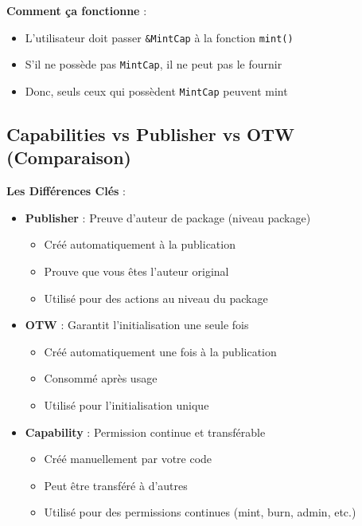 \documentclass[11pt]{article}
\begin{document}
\begin{noteBox}
\textbf{Comment ça fonctionne} :
\begin{itemize}
  \item L'utilisateur doit passer \texttt{\&MintCap} à la fonction \texttt{mint()}
  \item S'il ne possède pas \texttt{MintCap}, il ne peut pas le fournir
  \item Donc, seuls ceux qui possèdent \texttt{MintCap} peuvent mint
\end{itemize}
\end{noteBox}

\subsection{Capabilities vs Publisher vs OTW (Comparaison)}

\begin{explainBox}
\textbf{Les Différences Clés} :
\begin{itemize}
  \item \textbf{Publisher} : Preuve d'auteur de package (niveau package)
  \begin{itemize}
    \item Créé automatiquement à la publication
    \item Prouve que vous êtes l'auteur original
    \item Utilisé pour des actions au niveau du package
  \end{itemize}
  
  \item \textbf{OTW} : Garantit l'initialisation une seule fois
  \begin{itemize}
    \item Créé automatiquement une fois à la publication
    \item Consommé après usage
    \item Utilisé pour l'initialisation unique
  \end{itemize}
  
  \item \textbf{Capability} : Permission continue et transférable
  \begin{itemize}
    \item Créé manuellement par votre code
    \item Peut être transféré à d'autres
    \item Utilisé pour des permissions continues (mint, burn, admin, etc.)
  \end{itemize}
\end{itemize}
\end{explainBox}
\end{document}
